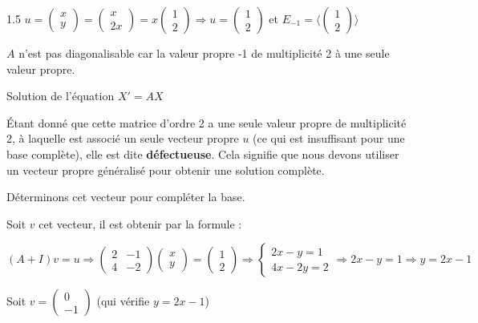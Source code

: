 \documentclass[12pt]{article}
\begin{document}
\begin{spacing}{1.5}
$u=\begin{pmatrix}
x\\
y
\end{pmatrix}=\begin{pmatrix}
x\\
2x
\end{pmatrix}=x\begin{pmatrix}
1\\
2
\end{pmatrix}\Rightarrow u=\begin{pmatrix}
1\\
2
\end{pmatrix}$ et $E_{-1}=\langle\begin{pmatrix}
1\\
2
\end{pmatrix}\rangle$

$A$ n'est pas diagonalisable car la valeur propre -1 de multiplicité 2 à une seule valeur propre.

Solution de l'équation $X'=AX$

Étant donné que cette matrice d'ordre 2 a une seule valeur propre de multiplicité 2, à laquelle est associé un seule vecteur propre $u$ (ce qui est insuffisant pour une base complète), elle est dite \textbf{défectueuse}. Cela signifie que nous devons utiliser un vecteur propre généralisé pour obtenir une solution complète. 

Déterminons cet vecteur pour compléter la base.

Soit $v$ cet vecteur, il est obtenir par la formule :

$(A+I)v=u\Longrightarrow \begin{pmatrix}
2 & -1 \\
4 & -2
\end{pmatrix}\begin{pmatrix}
x\\
y
\end{pmatrix}=\begin{pmatrix}
1\\
2
\end{pmatrix}\Rightarrow \begin{cases}
2x-y=1\\
4x-2y=2
\end{cases}
\Rightarrow 2x-y=1\Rightarrow y=2x-1$

Soit $v=\begin{pmatrix}
0\\
-1
\end{pmatrix}$ (qui vérifie $y=2x-1$)


\end{spacing}
\end{document}
